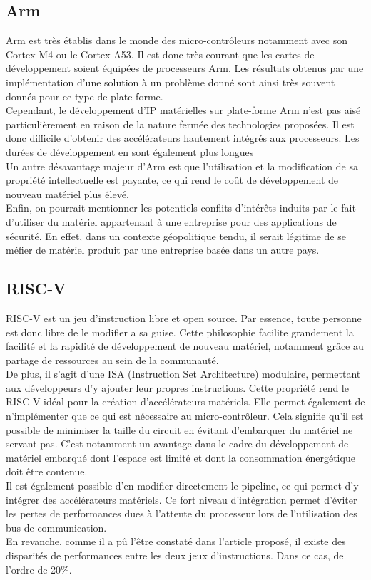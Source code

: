 \documentclass[10pt,a4paper]{article}
\begin{document}
\subsection{Arm}
Arm est très établis dans le monde des micro-contrôleurs notamment avec son Cortex M4 ou le Cortex A53. Il est donc très courant que les cartes de développement soient équipées 
de processeurs Arm. Les résultats obtenus par une implémentation d'une solution à un problème donné sont ainsi très souvent donnés pour ce type de plate-forme.\\
Cependant, le développement d'IP matérielles sur plate-forme Arm n'est pas aisé particulièrement en raison de la nature fermée des technologies proposées. Il est donc difficile d'obtenir 
des accélérateurs hautement intégrés aux processeurs. Les durées de développement en sont également plus longues\\
Un autre désavantage majeur d'Arm est que l'utilisation et la modification de sa propriété intellectuelle est payante, ce qui rend le coût de développement de nouveau matériel plus élevé.\\
Enfin, on pourrait mentionner les potentiels conflits d'intérêts induits par le fait d'utiliser du matériel appartenant à une entreprise pour des applications de sécurité. En effet, dans 
un contexte géopolitique tendu, il serait légitime de se méfier de matériel produit par une entreprise basée dans un autre pays. 

\subsection{RISC-V}
RISC-V est un jeu d'instruction libre et open source. Par essence, toute personne est donc libre de le modifier a sa guise. Cette philosophie facilite grandement la facilité et la rapidité
de développement de nouveau matériel, notamment grâce au partage de ressources au sein de la communauté.\\
De plus, il s'agit d'une ISA (Instruction Set Architecture) modulaire, permettant aux développeurs d'y ajouter leur propres instructions. Cette propriété rend le RISC-V idéal pour la création 
d'accélérateurs matériels. Elle permet également de n'implémenter que ce qui est nécessaire au micro-contrôleur. Cela signifie qu'il est possible de minimiser la taille du circuit en évitant 
d'embarquer du matériel ne servant pas. C'est notamment un avantage dans le cadre du développement de matériel embarqué dont l'espace est limité et dont la consommation énergétique doit être contenue. \\
Il est également possible d'en modifier directement le pipeline, ce qui permet d'y intégrer des accélérateurs matériels. Ce fort niveau d'intégration permet d'éviter les pertes de performances 
dues à l'attente du processeur lors de l'utilisation des bus de communication.\\ 
En revanche, comme il a pû l'être constaté dans l'article proposé, il existe des disparités de performances entre les deux jeux d'instructions. Dans ce cas, de l'ordre de 20\%.
\end{document}
